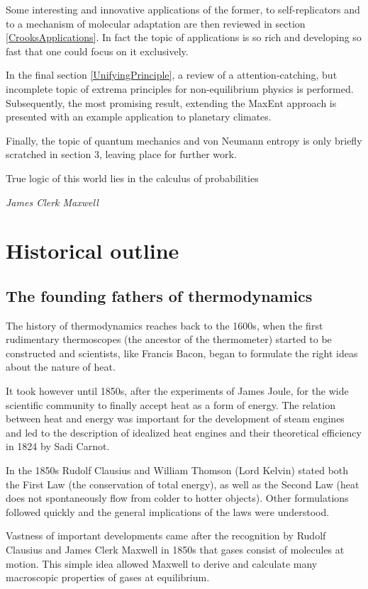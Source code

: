 \documentclass[a4paper,12pt]{article}
\begin{document}
Some interesting and innovative applications of the former, to self-replicators and to a mechanism of molecular adaptation are then reviewed in section \ref{CrooksApplications}. In fact the topic of applications is so rich and developing so fast that one could focus on it exclusively.

In the final section \ref{UnifyingPrinciple}, a review of a attention-catching, but incomplete topic of extrema principles for non-equilibrium physics is performed. Subsequently, the most promising result, extending the MaxEnt approach is presented with an example application to planetary climates.

Finally, the topic of quantum mechanics and von Neumann entropy is only briefly scratched in section 3, leaving place for further work.


\newpage
\epigraph{True logic of this world lies in the calculus of probabilities}{\textit{James Clerk Maxwell}}
\section{Historical outline}
\subsection{The founding fathers of thermodynamics}
The history of thermodynamics reaches back to the 1600s, when the first rudimentary thermoscopes (the ancestor of the thermometer) started to be constructed and scientists, like Francis Bacon, began to formulate the right ideas about the nature of heat. 

It took however until 1850s, after the experiments of James Joule, for the wide scientific community to finally accept heat as a form of energy. The relation between heat and energy was important for the development of steam engines and led to the description of idealized heat engines and their theoretical efficiency in 1824 by Sadi Carnot. 

In the 1850s Rudolf Clausius and William Thomson (Lord Kelvin) stated both the First Law (the conservation of total energy), as well as the Second Law (heat does not spontaneously flow from colder to hotter objects). Other formulations followed quickly and the general implications of the laws were understood. 

Vastness of important developments came after the recognition by Rudolf Clausius and James Clerk Maxwell in 1850s that gases consist of molecules at motion. This simple idea allowed Maxwell to derive and calculate many macroscopic properties of gases at equilibrium. 
\end{document}

